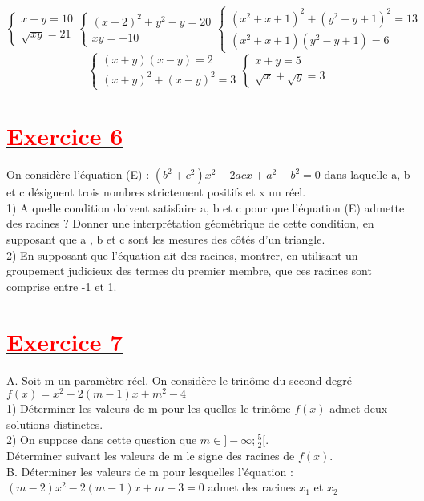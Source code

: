 \documentclass[12pt]{article}
\begin{document}
\begin{equation*}
\begin{cases}
x+y = 10 \\
\sqrt{xy}= 21
\end{cases}
\begin{cases}
(x+2)^{2}+y^{2}-y = 20 \\
xy = -10
\end{cases}
\begin{cases}
(x^{2}+x+1)^{2}+(y^{2}-y+1)^{2} = 13 \\
(x^{2}+x+1)(y^{2}-y+1) = 6
\end{cases}
\end{equation*}
\begin{equation*}
\begin{cases}
(x+y)(x-y)=2 \\
(x+y)^{2}+(x-y)^{2} = 3
\end{cases}
\begin{cases}
x+y = 5 \\
\sqrt{x}+\sqrt{y} = 3
\end{cases}
\end{equation*}
\section*{\underline{\textbf{\textcolor{red}{Exercice 6}}}}
On considère l’équation (E) : $(b^{2}+c^{2})x^{2}-2acx+a^{2}-b^{2}=0$ dans laquelle a, b et c
désignent trois nombres strictement positifs et x un réel.\\
1) A quelle condition doivent satisfaire a, b et c pour que l’équation (E) admette
des racines ?
Donner une interprétation géométrique de cette condition, en supposant que
a , b et c sont les mesures des côtés d’un triangle.\\
2) En supposant que l’équation ait des racines, montrer, en utilisant un
groupement judicieux des termes du premier membre, que ces racines sont
comprise entre -1 et 1.
\section*{\underline{\textbf{\textcolor{red}{Exercice 7}}}}
A. Soit m un paramètre réel. On considère le trinôme du second degré
$f(x) = x^{2} - 2(m - 1)x + m^{2} - 4$\\
1) Déterminer les valeurs de m pour les quelles le trinôme $f(x)$ admet deux
solutions distinctes.\\
2) On suppose dans cette question que $m \in]-\infty;\frac{5}{2}[.$\\
Déterminer suivant les valeurs de m le signe des racines de $f(x).$\\
B. Déterminer les valeurs de m pour lesquelles l’équation :\\
$(m - 2)x^{2} - 2(m - 1)x + m - 3 = 0$
admet des racines $x_{1}$ et $x_{2}$
\end{document}
